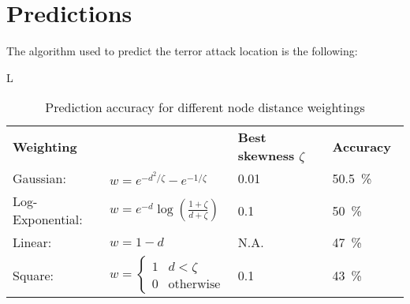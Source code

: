 \section{Predictions}
\label{sec:Predictions}

The algorithm used to predict the terror attack location is the following:

L

\begin{table}[H]
\caption{Prediction accuracy for different node distance weightings}
\begin{center}
\begin{tabular}{l l l l}
\multicolumn{2}{l}{\textbf{Weighting}}								& \textbf{Best skewness $\zeta$}		& \textbf{Accuracy} \\

Gaussian:		& $w=e^{-d^2/\zeta}-e^{-1/\zeta}$	& \SI{0.01}{}						&\SI{50.5}{\percent} \\

Log-Exponential:	& $w=e^{-d} \log\left( \frac{1+\zeta}{d+\zeta}\right)$				&\SI{0.1}{}							& \SI{50}{\percent} \\ 

Linear:		& $w=1-d$												& N.A. 							&\SI{47}{\percent} \\

Square:		&$w= \begin{cases}
1	&d < \zeta \\
0	& \text{otherwise}
\end{cases}$													& \SI{0.1}{}						& \SI{43}{\percent}
\end{tabular}
\end{center}
\label{default}
\end{table}